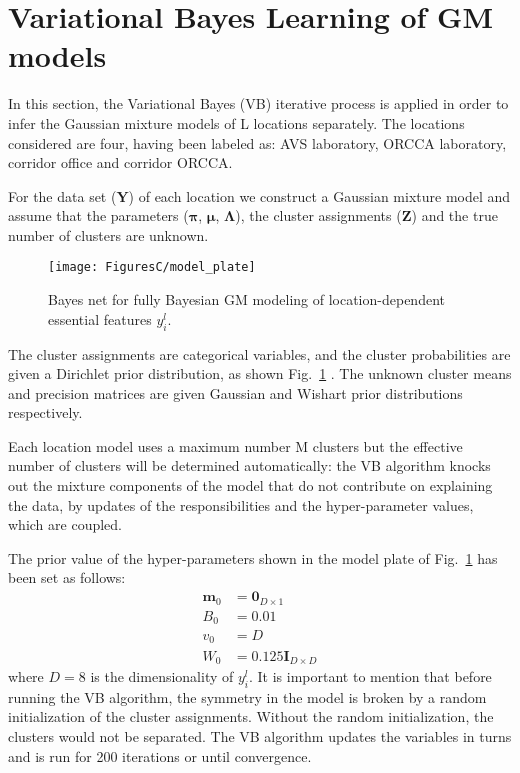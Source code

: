 \section{Variational Bayes Learning of GM models}
In this section, the Variational Bayes (VB) iterative process is applied in order to infer %
the Gaussian mixture models of L locations separately. 
The locations considered are four, having been labeled as: 
AVS laboratory, ORCCA laboratory, corridor office and corridor ORCCA.

For the data set ($\bm Y$) of each location we construct a Gaussian mixture model 
and assume that the parameters ($\bm\pi$, $\bm\mu$, $\bm\Lambda$), the cluster assignments ($\bm Z$) 
and the true number of clusters are unknown.
\begin{figure}[!h]
	\centerline{ \texttt{[image: FiguresC/model\_plate]}}
	\caption{
	Bayes net for fully Bayesian GM modeling of location-dependent essential features $y_i^{l}$. 
	}
 	\label{fig:model_plate}
\end{figure}
The cluster assignments are categorical variables, and the cluster probabilities are given a Dirichlet prior distribution, as shown Fig.~\ref{fig:model_plate} .
The unknown cluster means and precision matrices are given Gaussian and Wishart prior distributions respectively.


Each location model uses a maximum number M clusters 
but the effective number of clusters will be determined automatically:
the VB algorithm knocks out the mixture components of the model 
that do not contribute on explaining the data, by 
updates of the responsibilities and the hyper-parameter values, which are coupled.

The prior value of the hyper-parameters shown in the model plate of Fig.~\ref{fig:model_plate} 
has been set as follows:
\begin{subequations}
\begin{align}
	\bm{m}_0 &= \bm{0}_{D\times 1} \\
	B_0 &= 0.01 \\
	v_0 &= D \\
	W_0 &= 0.125 \bm{I}_{D\times D}
\end{align}
\end{subequations}
where $D=8$ is the dimensionality of $y_i^{l}$.
It is important to mention that before running the VB algorithm, 
the symmetry in the model is broken by a random initialization of the cluster assignments. 
Without the random initialization, the clusters would not be separated. 
The VB algorithm updates the variables in turns and is run for 200 iterations or until convergence.


